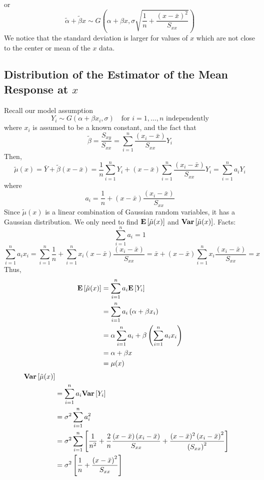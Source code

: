 or
\[\tilde{\alpha}+\tilde{\beta} x \sim G\left(\alpha+\beta x,
    \sigma \sqrt{\frac{1}{n}+\frac{(x-\bar{x})^{2}}{S_{x x}}}\right)\]
We notice that the standard deviation is larger for values
of $ x $ which are not close to the center or mean of the $ x $ data.

\subsection{Distribution of the Estimator of the Mean Response at $ x $}
Recall our model assumption
\[Y_{i} \sim G\left(\alpha+\beta x_{i}, \sigma\right)
    \quad \text{for } i=1, \ldots, n \text{ independently}\]
where $ x_i $ is assumed to be a known constant, and the fact that
\[\tilde{\beta}=\frac{S_{x y}}{S_{x x}}=\sum_{i=1}^{n} \frac{\left(x_{i}-\bar{x}\right)}{S_{x x}} Y_{i}\]
Then,
\[\tilde{\mu}(x)=\bar{Y}+\tilde{\beta}(x-\bar{x})=\frac{1}{n} \sum_{i=1}^{n} Y_{i}+(x-\bar{x})
    \sum_{i=1}^{n} \frac{\left(x_{i}-\bar{x}\right)}{S_{x x}} Y_{i}=\sum_{i=1}^{n} a_{i} Y_{i}\]
where
\[a_{i}=\frac{1}{n}+(x-\bar{x}) \frac{\left(x_{i}-\bar{x}\right)}{S_{x x}}\]
Since $ \tilde{\mu}(x) $ is a linear combination of Gaussian random variables, it has a Gaussian
distribution. We only need to find $ \bm{\mathrm{E}}\left[\tilde{\mu}(x)\right] $ and $ \bm{\mathrm{Var}}\left[\tilde{\mu}(x)\right] $.
Facts:
\[ \sum\limits_{i=1}^{n} a_i=1 \]
\[ \sum\limits_{i=1}^{n} a_i x_i=\sum\limits_{i=1}^{n} \frac{1}{n} +
    \sum\limits_{i=1}^{n} x_i\left( x-\bar{x} \right)\frac{(x_i-\bar{x})}{S_{xx}}
    =\bar{x}+\left( x-\bar{x} \right)\sum\limits_{i=1}^{n} x_i \frac{\left( x_i-\bar{x} \right)}{S_{xx}}=x  \]
Thus,
\[
    \begin{aligned}
        \bm{\mathrm{E}}\left[\tilde{\mu}(x)\right]
         & =\sum\limits_{i=1}^{n} a_i\bm{\mathrm{E}}\left[Y_i\right]                                                   \\
         & =\sum\limits_{i=1}^{n} a_i\left( \alpha+\beta x_i \right)                           \\
         & =\alpha \sum\limits_{i=1}^{n} a_i+\beta\left( \sum\limits_{i=1}^{n} a_i x_i \right) \\
         & =\alpha+\beta x                                                                     \\
         & =\mu(x)
    \end{aligned}
\]
\[
    \begin{aligned}
        \bm{\mathrm{Var}}\left[\tilde{\mu}(x)\right]                                                                                                  \\
         & =\sum\limits_{i=1}^{n} a_i\bm{\mathrm{Var}}\left[Y_i\right]                                                                                \\
         & =\sigma^2 \sum\limits_{i=1}^{n} a_i^2                                                                              \\
         & =\sigma^{2} \sum_{i=1}^{n}\left[\frac{1}{n^{2}}+\frac{2}{n} \frac{(x-\bar{x})\left(x_{i}-\bar{x}\right)}{S_{x x}}+
        \frac{(x-\bar{x})^{2}\left(x_{i}-\bar{x}\right)^{2}}{\left(S_{x x}\right)^{2}}\right]                                 \\
         & =\sigma^2\left[ \frac{1}{n} +\frac{\left( x-\bar{x} \right)^2}{S_{xx}}  \right]
    \end{aligned}
\]
